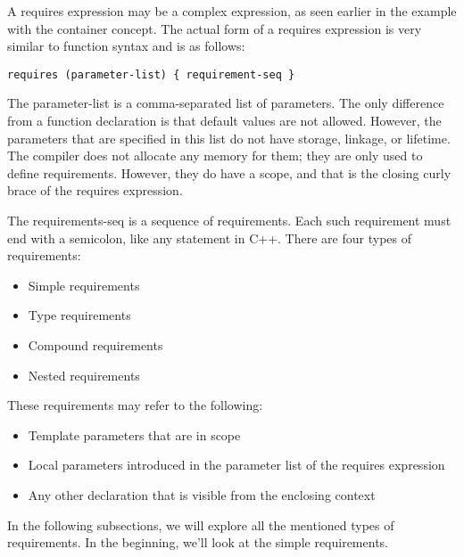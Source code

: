 
A requires expression may be a complex expression, as seen earlier in the example with the container concept. The actual form of a requires expression is very similar to function syntax and is as follows:

\begin{lstlisting}[style=styleCXX]
requires (parameter-list) { requirement-seq }
\end{lstlisting}

The parameter-list is a comma-separated list of parameters. The only difference from a function declaration is that default values are not allowed. However, the parameters that are specified in this list do not have storage, linkage, or lifetime. The compiler does not allocate any memory for them; they are only used to define requirements. However, they do have a scope, and that is the closing curly brace of the requires expression.

The requirements-seq is a sequence of requirements. Each such requirement must end with a semicolon, like any statement in C++. There are four types of requirements:

\begin{itemize}
\item
Simple requirements

\item
Type requirements

\item
Compound requirements

\item
Nested requirements
\end{itemize}

These requirements may refer to the following:

\begin{itemize}
\item
Template parameters that are in scope

\item
Local parameters introduced in the parameter list of the requires expression

\item
Any other declaration that is visible from the enclosing context
\end{itemize}

In the following subsections, we will explore all the mentioned types of requirements. In the beginning, we’ll look at the simple requirements.


